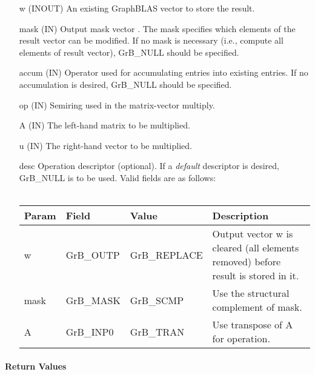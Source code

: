 \begin{itemize}[leftmargin=1.1in]
    \item[{\sf w}]    ({\sf INOUT}) An existing GraphBLAS vector to store the result.
    
    \item[{\sf mask}] ({\sf IN}) Output mask vector . The mask
    specifies which elements of the result vector can be modified.
    If no mask is necessary (i.e., compute all elements of result
    vector), {\sf GrB\_NULL} should be specified.

	\item[{\sf accum}]  ({\sf IN}) Operator used for accumulating entries into existing
                         entries. If no accumulation is desired,
	                    {\sf GrB\_NULL} should be specified.

    \item[{\sf op}]   ({\sf IN}) Semiring used in the matrix-vector multiply.
    \item[{\sf A}]    ({\sf IN}) The left-hand matrix to be multiplied.
    \item[{\sf u}]    ({\sf IN}) The right-hand vector to be multiplied.

    \item[{\sf desc}]  Operation descriptor (optional). If a
    \emph{default} descriptor is desired, {\sf GrB\_NULL} is to be
    used. Valid fields are as follows: \\ ~ \\
    \begin{tabular}{lllp{2.5in}}
    Param & Field  & Value & Description \\
    \hline
    {\sf w}    & {\sf GrB\_OUTP} & {\sf GrB\_REPLACE} & Output vector {\sf w} is cleared (all elements removed) before result is stored in it.\\
    {\sf mask} & {\sf GrB\_MASK} & {\sf GrB\_SCMP}   & Use the structural complement of {\sf mask}. \\
    {\sf A}    & {\sf GrB\_INP0} & {\sf GrB\_TRAN}   & Use transpose of {\sf A} for operation. \\
    \end{tabular}
\end{itemize}

\paragraph{Return Values}

